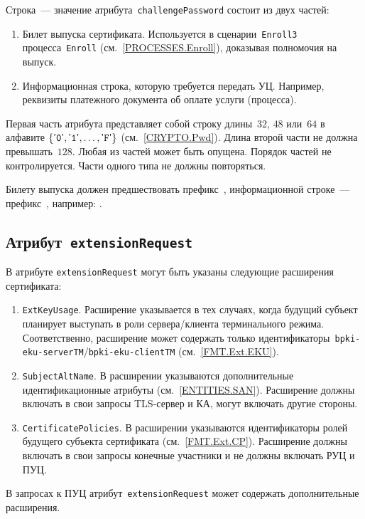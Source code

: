 Строка~--- значение атрибута~\texttt{challengePassword} состоит из двух частей:
\begin{enumerate} 
\item
Билет выпуска сертификата. Используется в сценарии~\texttt{Enroll3} 
процесса~\texttt{Enroll} (см.~\ref{PROCESSES.Enroll}), 
доказывая полномочия на выпуск.

\item
Информационная строка, которую требуется передать УЦ.
Например, реквизиты платежного документа об оплате услуги (процесса).
\end{enumerate}

Первая часть атрибута представляет собой строку длины~$32$, $48$ или~$64$ 
в алфавите  $\{\texttt{\textsf{'}0\textsf{'}},\texttt{\textsf{'}1\textsf{'}},\ldots,\texttt{\textsf{'}F\textsf{'}}\}$ (см.~\ref{CRYPTO.Pwd}).
Длина второй части не должна превышать~$128$. 
Любая из частей может быть опущена. 
Порядок частей не контролируется.
Части одного типа не должны повторяться.

Билету выпуска должен предшествовать префикс~,
информационной строке~--- префикс~,
например: .

\subsection{Атрибут~\texttt{extensionRequest}}\label{FMT.CSR.ER}

В атрибуте \texttt{extensionRequest} могут быть указаны следующие 
расширения сертификата:
\begin{enumerate}
\item 
\texttt{ExtKeyUsage}. Расширение указывается в тех случаях, 
когда будущий субъект планирует выступать в роли сервера/клиента 
терминального режима. Соответственно, расширение может содержать только 
идентификаторы~\verb|bpki-eku-serverTM|/\verb|bpki-eku-clientTM| 
(см.~\ref{FMT.Ext.EKU}). 

\item 
\texttt{SubjectAltName}. В расширении указываются 
дополнительные идентификационные атрибуты (см.~\ref{ENTITIES.SAN}). 
Расширение должны включать в свои запросы TLS-сервер и КА,
могут включать другие стороны.

\item
\texttt{CertificatePolicies}. В расширении
указываются идентификаторы ролей будущего субъекта сертификата
(см.~\ref{FMT.Ext.CP}).
Расширение должны включать в свои запросы конечные участники 
и не должны включать РУЦ и ПУЦ.
\end{enumerate}

В запросах к ПУЦ атрибут~\texttt{extensionRequest} может содержать 
дополнительные расширения.
